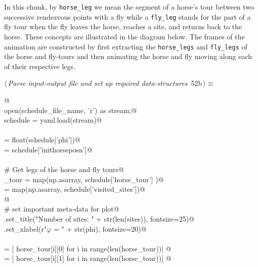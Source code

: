 \documentclass[11.5pt]{report}
\begin{document}
\vspace{-0.8cm} \newchunk In this chunk, by \verb|horse_leg| we mean the segment of a horse's 
tour between two successive rendezvous points with a fly while a \verb|fly_leg| stands for 
the part of a fly tour when the fly leaves the horse, reaches a site, and returns back to the horse. These
concepts are illustrated in the diagram below. The frames of the animation are constructed by first
extracting the \verb|horse_legs| and \verb|fly_legs| of the horse and fly-tours and then 
animating the horse and fly moving along each of their respective legs. 


\begin{flushleft} \small\label{scrap84}\raggedright\small
{} $\langle\,${\itshape Parse input-output file and set up required data-structures}\nobreak\ {\footnotesize {52b}}$\,\rangle\equiv$
\vspace{-1ex}
\begin{list}{}{} \item
\mbox{}\verb@   @\\
\mbox{}\verb@with open(schedule_file_name, 'r') as stream:@\\
\mbox{}\verb@      schedule = yaml.load(stream)@\\
\mbox{}\verb@@\\
\mbox{}\verb@phi           = float(schedule['phi'])@\\
\mbox{}\verb@inithorseposn = schedule['inithorseposn']@\\
\mbox{}\verb@@\\
\mbox{}\verb@# Get legs of the horse and fly tours@\\
\mbox{}\verb@horse_tour  = map(np.asarray, schedule['horse_tour']   )@\\
\mbox{}\verb@sites       = map(np.asarray, schedule['visited_sites'])@\\
\mbox{}\verb@           @\\
\mbox{}\verb@# set important meta-data for plot@\\
\mbox{}\verb@ax.set_title("Number of sites: " + str(len(sites)), fontsize=25)@\\
\mbox{}\verb@ax.set_xlabel(r"$\varphi$ = " + str(phi), fontsize=20)@\\
\mbox{}\verb@@\\
\mbox{}\verb@xhs = [ horse_tour[i][0] for i in range(len(horse_tour))]    @\\
\mbox{}\verb@yhs = [ horse_tour[i][1] for i in range(len(horse_tour))]    @\\

\end{list}
\end{flushleft}
\end{document}
